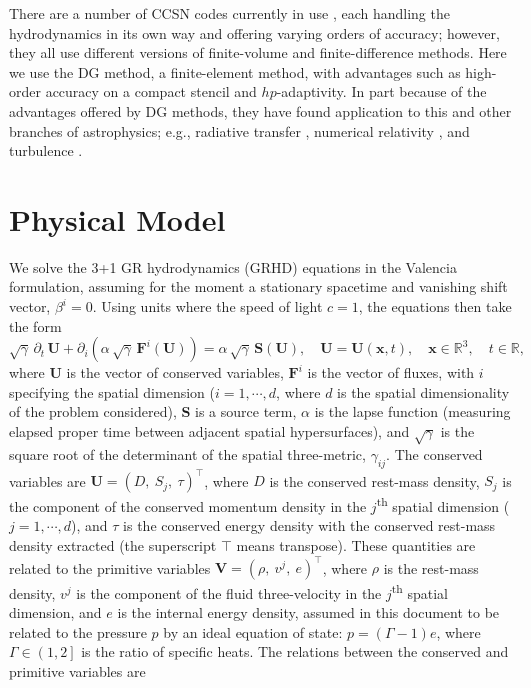 \documentclass[letterpaper]{jpconf}
\renewcommand{\bs}[1]{\boldsymbol{#1}}
\begin{document}
There are a number of CCSN codes currently in use \cite{AGILEBOLTZTRAN,CHIMERA,FORNAX,ALCAR,PROMETHEUSVERTEX,COCONUTVERTEX,ZELMANI,FLASH,GR1D,Kotake,Nagakura}, each handling the hydrodynamics in its own way and offering varying orders of accuracy; however, they all use different versions of finite-volume and finite-difference methods. Here we use the DG method, a finite-element method, with advantages such as high-order accuracy on a compact stencil and $hp$-adaptivity. In part because of the advantages offered by DG methods, they have found application to this and other branches of astrophysics; e.g., radiative transfer \cite{Chu2019,Endeve2015,Radice2013,Kitzmann2016}, numerical relativity \cite{Teukolsky2016}, and turbulence \cite{BauerDG}.

\section{Physical Model}
We solve the 3+1 GR hydrodynamics (GRHD) equations in the Valencia formulation, assuming for the moment a stationary spacetime and vanishing shift vector, $\beta^{i}=0$. Using units where the speed of light $c=1$, the equations then take the form \cite{RezzollaZanottiRelativisticHydrodynamics}
\begin{equation}\label{Eq:Hydro}
  \sqrt{\gamma}\,\partial_{t}\,\bs{U}+\partial_{i}\left(\alpha\,\sqrt{\gamma}\,\bs{F}^{i}\left(\bs{U}\right)\right)=\alpha\,\sqrt{\gamma}\,\bs{S}\left(\bs{U}\right),\hspace{1em}\bs{U}=\bs{U}\left(\bs{x},t\right),\hspace{1em}\bs{x}\in\mathbb{R}^{3},\hspace{1em}t\in\mathbb{R},
\end{equation}
where $\bs{U}$ is the vector of conserved variables, $\bs{F}^{i}$ is the vector of fluxes, with $i$ specifying the spatial dimension ($i=1,\cdots,d$, where $d$ is the spatial dimensionality of the problem considered), $\bs{S}$ is a source term, $\alpha$ is the lapse function (measuring elapsed proper time between adjacent spatial hypersurfaces), and $\sqrt{\gamma}$ is the square root of the determinant of the spatial three-metric, $\gamma_{ij}$. The conserved variables are $\bs{U}=\left(D,\ S_{j},\ \tau\right)^{\top}$, where $D$ is the conserved rest-mass density, $S_{j}$ is the component of the conserved momentum density in the $j$\textsuperscript{th} spatial dimension ($j=1,\cdots,d$), and $\tau$ is the conserved energy density with the conserved rest-mass density extracted (the superscript $\top$ means transpose). These quantities are related to the primitive variables $\bs{V}=\left(\rho,\ v^{j},\ e\right)^{\top}$, where $\rho$ is the rest-mass density, $v^{j}$ is the component of the fluid three-velocity in the $j$\textsuperscript{th} spatial dimension, and $e$ is the internal energy density, assumed in this document to be related to the pressure $p$ by an ideal equation of state: $p=\left(\Gamma-1\right)e$, where $\Gamma\in\left(1,2\right]$ is the ratio of specific heats. The relations between the conserved and primitive variables are
\end{document}
